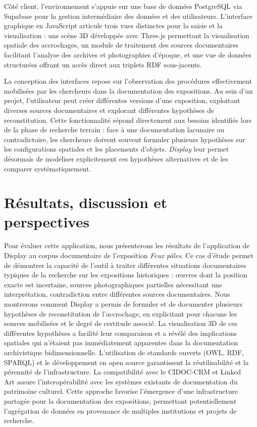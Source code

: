 \documentclass[fra, final]{anthology-ch}         %
\begin{document}
Côté client, l’environnement s’appuie sur une base de données PostgreSQL via Supabase pour la gestion intermédiaire des données et des utilisateurs. L’interface graphique en JavaScript articule trois vues distinctes pour la saisie et la visualisation : une scène 3D développée avec Three.js permettant la visualisation spatiale des accrochages, un module de traitement des sources documentaires facilitant l’analyse des archives et photographies d’époque, et une vue de données structurées offrant un accès direct aux triplets RDF sous-jacents.

La conception des interfaces repose sur l’observation des procédures effectivement mobilisées par les chercheurs dans la documentation des expositions. Au sein d’un projet, l’utilisateur peut créer différentes versions d’une exposition, exploitant diverses sources documentaires et explorant différentes hypothèses de reconstitution. Cette fonctionnalité répond directement aux besoins identifiés lors de la phase de recherche terrain : face à une documentation lacunaire ou contradictoire, les chercheurs doivent souvent formuler plusieurs hypothèses sur les configurations spatiales et les placements d’objets. \textit{Display }leur permet désormais de modéliser explicitement ces hypothèses alternatives et de les comparer systématiquement.

\section{Résultats, discussion et perspectives}

Pour évaluer cette application, nous présenterons les résultats de l’application de Display au corpus documentaire de l’exposition \textit{Feux pâles}. Ce cas d’étude permet de démontrer la capacité de l’outil à traiter différentes situations documentaires typiques de la recherche sur les expositions historiques : œuvres dont la position exacte est incertaine, sources photographiques partielles nécessitant une interprétation, contradiction entre différentes sources documentaires. Nous montrerons comment Display a permis de formuler et de documenter plusieurs hypothèses de reconstitution de l’accrochage, en explicitant pour chacune les sources mobilisées et le degré de certitude associé. La visualisation 3D de ces différentes hypothèses a facilité leur comparaison et a révélé des implications spatiales qui n’étaient pas immédiatement apparentes dans la documentation archivistique bidimensionnelle. L’utilisation de standards ouverts (OWL, RDF, SPARQL) et le développement en open source garantissent la réutilisabilité et la pérennité de l’infrastructure. La compatibilité avec le CIDOC-CRM et Linked Art assure l’interopérabilité avec les systèmes existants de documentation du patrimoine culturel. Cette approche favorise l’émergence d’une infrastructure partagée pour la documentation des expositions, permettant potentiellement l’agrégation de données en provenance de multiples institutions et projets de recherche.
\end{document}

